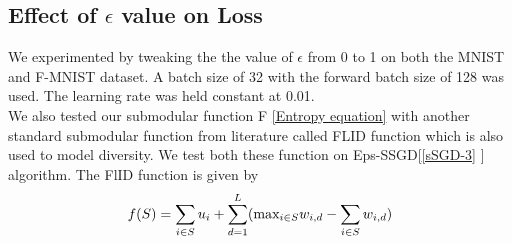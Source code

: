 \documentclass[a4paper,twoside]{iiththesis}
\theoremstyle{definition}
\theoremstyle{definition}
\theoremstyle{remark}
\begin{document}
\subsection{Effect of $\epsilon$ value on Loss}

We experimented by tweaking the the value of $\epsilon$ from 0 to 1 on both the MNIST and F-MNIST dataset. A batch size of 32 with the forward batch size of 128 was used. The learning rate was held constant at 0.01. \\

We also tested our submodular function F \ref{Entropy equation} with another standard submodular function from literature \cite{tschiatschek2016learning} called FLID function which is also used to model diversity. We test both these function on Eps-SSGD[\ref{sSGD-3} ] algorithm. The FlID function is given by\\

\begin{equation}
f(S) = \sum_{i\in S} u_i + \sum_{d=1}^L (\text{max}_{i\in S} \space w_{i, d} - \sum_{i \in S} w_{i, d} )
\end{equation}
\end{document}

